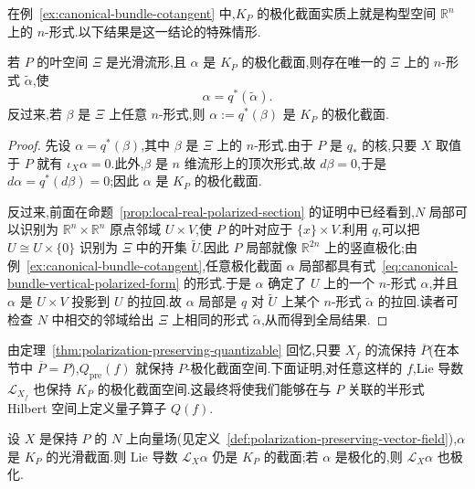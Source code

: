 {在例~\ref{ex:canonical-bundle-cotangent} 中,$K_P$ 的极化截面实质上就是构型空间 $\mathbb R^n$ 上的 $n$-形式.以下结果是这一结论的特殊情形.

\begin{proposition}[典范丛极化截面与叶空间形式]
\label{prop:canonical-bundle-leaf-space}
若 $P$ 的叶空间 $\Xi$ 是光滑流形,且 $\alpha$ 是 $K_P$ 的极化截面,则存在唯一的 $\Xi$ 上的 $n$-形式 $\widetilde\alpha$,使
\[
 \alpha=q^*(\widetilde\alpha).
\]
反过来,若 $\beta$ 是 $\Xi$ 上任意 $n$-形式,则 $\alpha:=q^*(\beta)$ 是 $K_P$ 的极化截面.
\end{proposition}

\begin{proof}
先设 $\alpha=q^*(\beta)$,其中 $\beta$ 是 $\Xi$ 上的 $n$-形式.由于 $P$ 是 $q_*$ 的核,只要 $X$ 取值于 $P$ 就有 $\iota_X\alpha=0$.此外,$\beta$ 是 $n$ 维流形上的顶次形式,故 $d\beta=0$,于是 $d\alpha=q^*(d\beta)=0$;因此 $\alpha$ 是 $K_P$ 的极化截面.

反过来,前面在命题~\ref{prop:local-real-polarized-section} 的证明中已经看到,$N$ 局部可以识别为 $\mathbb R^n\times\mathbb R^n$ 原点邻域 $U\times V$,使 $P$ 的叶对应于 $\{x\}\times V$.利用 $q$,可以把 $U\cong U\times\{0\}$ 识别为 $\Xi$ 中的开集 $\widetilde U$.因此 $P$ 局部就像 $\mathbb R^{2n}$ 上的竖直极化;由例~\ref{ex:canonical-bundle-cotangent},任意极化截面 $\alpha$ 局部都具有式~\eqref{eq:canonical-bundle-vertical-polarized-form} 的形式.于是 $\alpha$ 确定了 $U$ 上的一个 $n$-形式 $\widehat\alpha$,并且 $\alpha$ 是 $U\times V$ 投影到 $U$ 的拉回.故 $\alpha$ 局部是 $q$ 对 $\widetilde U$ 上某个 $n$-形式 $\widetilde\alpha$ 的拉回.读者可检查 $N$ 中相交的邻域给出 $\Xi$ 上相同的形式 $\widetilde\alpha$,从而得到全局结果.
\end{proof}

由定理~\ref{thm:polarization-preserving-quantizable} 回忆,只要 $X_f$ 的流保持 $\overline P$(在本节中 $\overline P=P$),$Q_{\mathrm{pre}}(f)$ 就保持 $P$-极化截面空间.下面证明,对任意这样的 $f$,Lie 导数 $\mathcal L_{X_f}$ 也保持 $K_P$ 的极化截面空间.这最终将使我们能够在与 $P$ 关联的半形式 Hilbert 空间上定义量子算子 $Q(f)$.

\begin{proposition}
\label{prop:lie-derivative-canonical-bundle}
设 $X$ 是保持 $P$ 的 $N$ 上向量场(见定义~\ref{def:polarization-preserving-vector-field}),$\alpha$ 是 $K_P$ 的光滑截面.则 Lie 导数 $\mathcal L_X\alpha$ 仍是 $K_P$ 的截面;若 $\alpha$ 是极化的,则 $\mathcal L_X\alpha$ 也极化.
\end{proposition}

}
